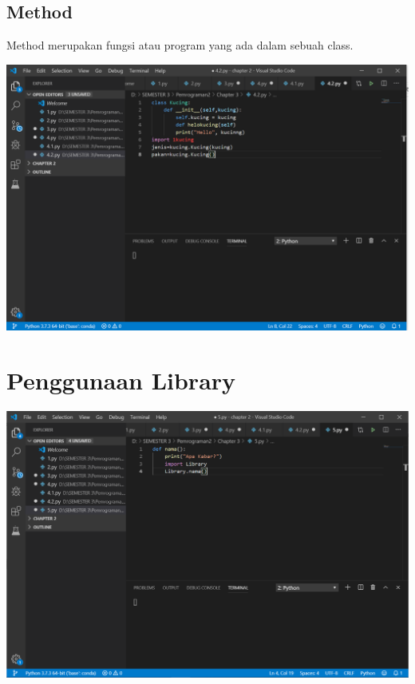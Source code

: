 \documentclass{article}
\begin{document}
\subsection{Method}
Method merupakan fungsi atau program yang ada dalam sebuah class.
\begin{center}
    \includegraphics[width=.8\textwidth]{keterampilan/4.2.PNG}
\end{center}

\section{Penggunaan Library}
\begin{center}
    \includegraphics[width=.8\textwidth]{keterampilan/5.PNG}
\end{center}
\end{document}
